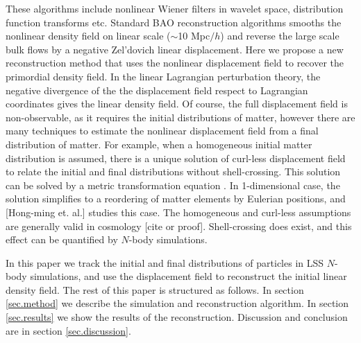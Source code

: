 \documentclass[aps,prd,twocolumn,superscriptaddress,amsfont,amssymb,amsmath,nofootinbib,showpacs,balancelastpage]{revtex4-1}
\begin{document}
These algorithms include nonlinear Wiener filters in wavelet space, distribution function transforms etc. Standard BAO reconstruction algorithms smooths the nonlinear density field on linear scale ($\sim$10 Mpc$/h$) and reverse the large scale bulk flows by a negative Zel'dovich linear displacement. Here we propose a new reconstruction method that uses the nonlinear displacement field to recover the primordial density field. In the linear Lagrangian perturbation theory, the negative divergence of the the displacement field respect to Lagrangian coordinates gives the linear density field. Of course, the full displacement field is non-observable, as it requires the initial distributions of matter, however there are many techniques to estimate the nonlinear displacement field from a final distribution of matter. For example, when a homogeneous initial matter distribution is assumed, there is a unique solution of curl-less displacement field to relate the initial and final distributions without shell-crossing. This solution can be solved by a metric transformation equation \citep{1995ApJS..100..269P,1998ApJS..115...19P}. In 1-dimensional case, the solution simplifies to a reordering of matter elements by Eulerian positions, and [Hong-ming et. al.] studies this case. The homogeneous and curl-less assumptions are generally valid in cosmology [cite or proof]. Shell-crossing does exist, and this effect can be quantified by $N$-body simulations.

In this paper we track the initial and final distributions of particles in LSS $N$-body simulations, and use the displacement field to reconstruct the initial linear density field. The rest of this paper is structured as follows. In section \ref{sec.method} we describe the simulation and reconstruction algorithm. In section \ref{sec.results} we show the results of the reconstruction. Discussion and conclusion are in section \ref{sec.discussion}.
\end{document}
